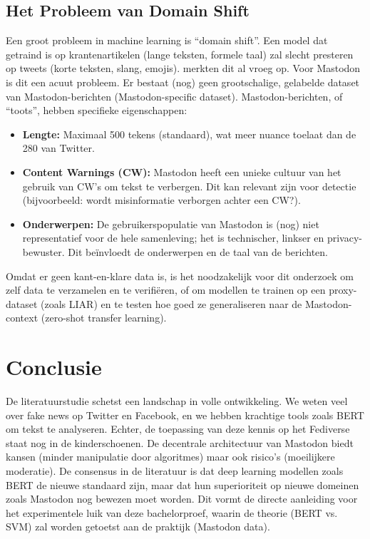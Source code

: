 \subsection{Het Probleem van Domain Shift}
Een groot probleem in machine learning is ``domain shift''. Een model dat getraind is op krantenartikelen (lange teksten, formele taal) zal slecht presteren op tweets (korte teksten, slang, emojis). \textcite{castillo2011information} merkten dit al vroeg op.
Voor Mastodon is dit een acuut probleem. Er bestaat (nog) geen grootschalige, gelabelde dataset van Mastodon-berichten (Mastodon-specific dataset).
Mastodon-berichten, of ``toots'', hebben specifieke eigenschappen:
\begin{itemize}
    \item \textbf{Lengte:} Maximaal 500 tekens (standaard), wat meer nuance toelaat dan de 280 van Twitter.
    \item \textbf{Content Warnings (CW):} Mastodon heeft een unieke cultuur van het gebruik van CW's om tekst te verbergen. Dit kan relevant zijn voor detectie (bijvoorbeeld: wordt misinformatie verborgen achter een CW?).
    \item \textbf{Onderwerpen:} De gebruikerspopulatie van Mastodon is (nog) niet representatief voor de hele samenleving; het is technischer, linkser en privacy-bewuster. Dit beïnvloedt de onderwerpen en de taal van de berichten.
\end{itemize}

Omdat er geen kant-en-klare data is, is het noodzakelijk voor dit onderzoek om zelf data te verzamelen en te verifiëren, of om modellen te trainen op een proxy-dataset (zoals LIAR) en te testen hoe goed ze generaliseren naar de Mastodon-context (zero-shot transfer learning).

\section{Conclusie}

De literatuurstudie schetst een landschap in volle ontwikkeling. We weten veel over fake news op Twitter en Facebook, en we hebben krachtige tools zoals BERT om tekst te analyseren. Echter, de toepassing van deze kennis op het Fediverse staat nog in de kinderschoenen. De decentrale architectuur van Mastodon biedt kansen (minder manipulatie door algoritmes) maar ook risico's (moeilijkere moderatie).
De consensus in de literatuur is dat deep learning modellen zoals BERT de nieuwe standaard zijn, maar dat hun superioriteit op nieuwe domeinen zoals Mastodon nog bewezen moet worden. Dit vormt de directe aanleiding voor het experimentele luik van deze bachelorproef, waarin de theorie (BERT vs. SVM) zal worden getoetst aan de praktijk (Mastodon data).



